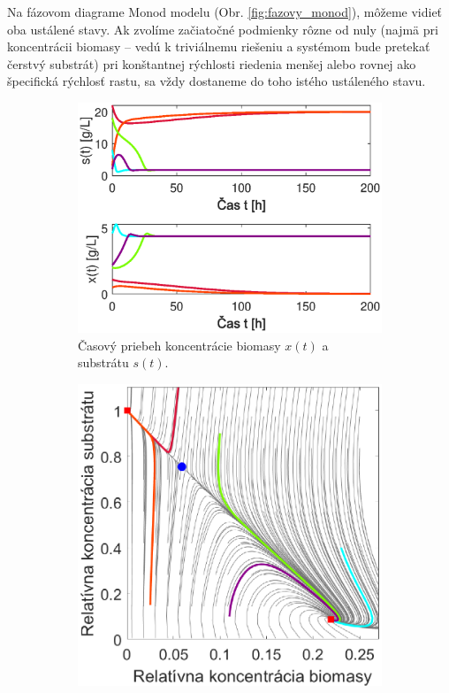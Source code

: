 Na  fázovom diagrame Monod modelu (Obr. \ref{fig:fazovy_monod}), môžeme vidieť oba ustálené stavy. Ak zvolíme začiatočné podmienky rôzne od nuly (najmä pri koncentrácii biomasy -- vedú k triviálnemu riešeniu a systémom bude pretekať čerstvý substrát) pri konštantnej rýchlosti riedenia menšej alebo rovnej ako špecifická rýchlosť rastu, sa vždy dostaneme do toho istého ustáleného stavu.
\begin{figure}
	\centering
	\begin{subfigure}[b]{0.49\textwidth}
		\centering
		\includegraphics[width=\linewidth]{images/phase1_haldane}
		\caption{Časový priebeh koncentrácie biomasy $ x(t) $ a substrátu $ s(t) $.}
		\label{fig:fazovy_vyber_haldane}
	\end{subfigure}
	\begin{subfigure}[b]{0.49\textwidth}
		\centering
		\includegraphics[width=\linewidth]{images/phase2_haldane}

\end{subfigure}
\end{figure}
